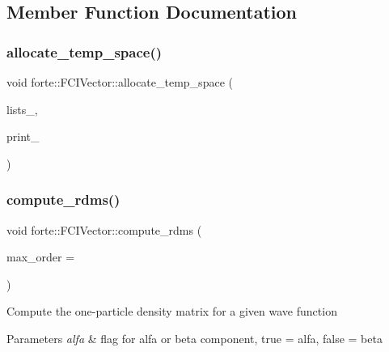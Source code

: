 \subsection{Member Function Documentation}
\mbox{\label{classforte_1_1_f_c_i_vector_ad3aed0f04ae2cb88c0f77c02197f6d02}} 
\subsubsection{\texorpdfstring{allocate\+\_\+temp\+\_\+space()}{allocate\_temp\_space()}}
{\footnotesize\ttfamily void forte\+::\+F\+C\+I\+Vector\+::allocate\+\_\+temp\+\_\+space (\begin{DoxyParamCaption}\item[{std\+::shared\+\_\+ptr$<$ \mbox{\hyperlink{classforte_1_1_string_lists}{String\+Lists}} $>$}]{lists\+\_\+,  }\item[{int}]{print\+\_\+ }\end{DoxyParamCaption})\hspace{0.3cm}{\ttfamily [static]}}

\mbox{\label{classforte_1_1_f_c_i_vector_a3d1f90f4570df5b367dd8b356d2afb0a}} 
\subsubsection{\texorpdfstring{compute\+\_\+rdms()}{compute\_rdms()}}
{\footnotesize\ttfamily void forte\+::\+F\+C\+I\+Vector\+::compute\+\_\+rdms (\begin{DoxyParamCaption}\item[{int}]{max\+\_\+order = {} }\end{DoxyParamCaption})}

Compute the one-\/particle density matrix for a given wave function 
\begin{DoxyParams}{Parameters}
{\em alfa} & flag for alfa or beta component, true = alfa, false = beta \\
\hline
\end{DoxyParams}
\mbox{\label{classforte_1_1_f_c_i_vector_a4c1591f17c9b23b29730a2f1d76c5785}} 

